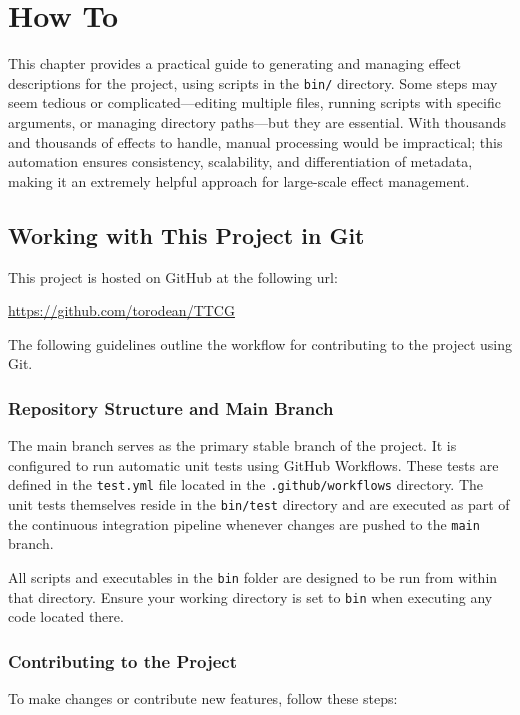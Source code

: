 \chapter{How To}

This chapter provides a practical guide to generating and managing effect descriptions for the project, using scripts in the \texttt{bin/} directory. Some steps may seem tedious or complicated—editing multiple files, running scripts with specific arguments, or managing directory paths—but they are essential. With thousands and thousands of effects to handle, manual processing would be impractical; this automation ensures consistency, scalability, and differentiation of metadata, making it an extremely helpful approach for large-scale effect management.







\section{Working with This Project in Git}

This project is hosted on GitHub at the following url:
\begin{center}
\url{https://github.com/torodean/TTCG}
\end{center}
The following guidelines outline the workflow for contributing to the project using Git.

\subsection{Repository Structure and Main Branch}
The main branch serves as the primary stable branch of the project. It is configured to run automatic unit tests using GitHub Workflows. These tests are defined in the \texttt{test.yml} file located in the \texttt{.github/workflows} directory. The unit tests themselves reside in the \texttt{bin/test} directory and are executed as part of the continuous integration pipeline whenever changes are pushed to the \texttt{main} branch.

All scripts and executables in the \texttt{bin} folder are designed to be run from within that directory. Ensure your working directory is set to \texttt{bin} when executing any code located there.

\subsection{Contributing to the Project}
To make changes or contribute new features, follow these steps:

